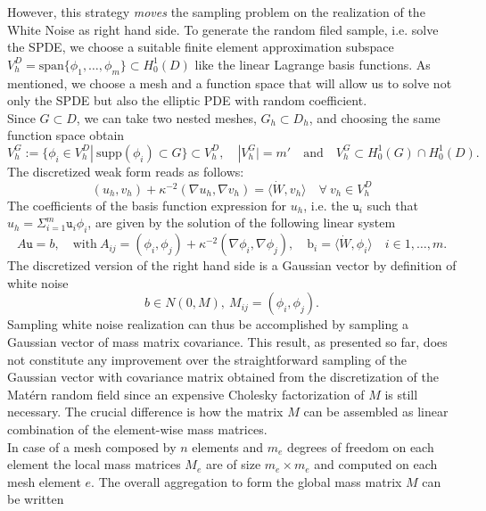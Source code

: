 \documentclass[a4paper, 11pt, oneside]{scrartcl}
\begin{document}
However, this strategy \textit{moves} the sampling problem on the realization of the White Noise as right hand side. 
To generate the random filed sample, i.e. solve the SPDE, we choose a suitable finite element approximation subspace \( V_h^D = \text{span} \{\phi_1, \dots, \phi_m \} \subset H^1_0(D)\) like the linear Lagrange basis functions. As mentioned, we choose a mesh and a function space that will allow us to solve not only the SPDE but also the elliptic PDE with random coefficient.\\
Since \(G \subset D\), we can take two nested meshes, \( G_h \subset D_h\), and choosing the same function space obtain 
\begin{equation}
 V_h^G := \{ \phi_i \in V_h^D | \ \text{supp}(\phi_i) \subset G \} \subset V_h^D, \quad |V_h^G| = m' \quad \text{and}\quad V_h^G \subset H^1_0(G) \cap H^1_0(D).
\end{equation}
The discretized weak form reads as follows:
\begin{equation}
(u_h,v_h) + \kappa^{-2}( \nabla u_h,\nabla v_h) = \langle \dot{W}, v_h \rangle \quad \forall \ v_h \in V_h^D
\end{equation}
The coefficients of the basis function expression for \(u_h\), i.e. the \( \texttt{u}_i\) such that \( u_h = \Sigma_{i=1}^m \texttt{u}_i \phi_i \), are given by the solution of the following linear system
\begin{equation}
A \texttt{u} = b, \quad \text{with} \ A_{ij} = (\phi_i,\phi_j) + \kappa^{-2} (\nabla \phi_i,\nabla \phi_j), \quad \text{b}_i = \langle \dot{W}, \phi_i \rangle \quad i \in 1, \dots, m. 
\end{equation}
The discretized version of the right hand side is a Gaussian vector by definition of white noise 
\begin{equation}
b \in N(0,M),\ M_{ij} = (\phi_i,\phi_j).  
\end{equation}
Sampling white noise realization can thus be accomplished by sampling a Gaussian vector of mass matrix covariance. 
This result, as presented so far, does not constitute any improvement over the straightforward sampling of the Gaussian vector with covariance matrix obtained from the discretization of the Matérn random field since an expensive Cholesky factorization of \(M\) is still necessary. 
The crucial difference is how the matrix \(M\) can be assembled as linear combination of the element-wise mass matrices. \\
In case of a mesh composed by \(n\) elements and \(m_e\) degrees of freedom on each element the local mass matrices \(M_e\) are of size \( m_e \times m_e \) and  computed on each mesh element  \(e\). The overall aggregation to form the global mass matrix \(M\) can be written 
\end{document}
